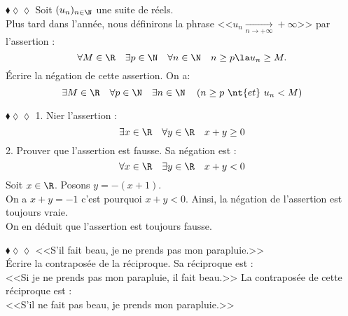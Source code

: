\documentclass[11pt]{article}
\begin{document}
\begin{exercice}{$\blacklozenge\lozenge\lozenge$}{}
    Soit $(u_n)_{n\in\N}$ une suite de réels.\\
    Plus tard dans l'année, nous définirons la phrase <<$u_n\xrightarrow[n\to+\infty]{}+\infty$>> par l'assertion :
    \begin{equation*}
        \forall M \in \R \quad \exists p \in \N \quad \forall n \in \N \quad n \geq p \la u_n\geq M.
    \end{equation*}
    Écrire la négation de cette assertion.
    \tcblower
    On a:
    \begin{equation*}
        \exists M \in \R \quad \forall p \in \N \quad \exists n \in \N \quad \left(n \geq p ~ \nt{ et } ~ u_n<M\right)
    \end{equation*}
\end{exercice}

\begin{exercice}{$\blacklozenge\lozenge\lozenge$}{}
    1. Nier l'assertion :
    \begin{equation*}
        \exists x \in \R \quad \forall y \in \R \quad x+y \geq 0
    \end{equation*}
    2. Prouver que l'assertion est fausse.
    \tcblower
     Sa négation est :
    \begin{equation*}
        \forall x \in \R \quad \exists y \in \R \quad x+y<0
    \end{equation*}
     Soit $x \in \R$. Posons $y=-(x+1)$.\\
    On a $x+y=-1$ c'est pourquoi $x+y<0$. Ainsi, la négation de l'assertion est toujours vraie.\\
    On en déduit que l'assertion est toujours fausse.
\end{exercice}

\begin{exercice}{$\blacklozenge\lozenge\lozenge$}{}
    <<S'il fait beau, je ne prends pas mon parapluie.>>\\
    Écrire la contraposée de la réciproque.
    \tcblower
    Sa réciproque est :\\
    <<Si je ne prends pas mon parapluie, il fait beau.>>\n
    La contraposée de cette réciproque est :\\
    <<S'il ne fait pas beau, je prends mon parapluie.>>
\end{exercice}

\pagebreak
\end{document}
